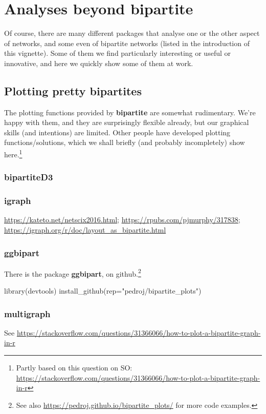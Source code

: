 \documentclass[a4paper, 11pt]{article}\usepackage[]{graphicx}\usepackage[]{color}
\newcommand{\package}[1]{\textbf{#1}}
\begin{document}
\section{Analyses beyond \package{bipartite}}%
Of course, there are many different packages that analyse one or the other aspect of networks, and some even of bipartite networks (listed in the introduction of this vignette). Some of them we find particularly interesting or useful or innovative, and here we quickly show some of them at work.

\subsection{Plotting pretty bipartites}
The plotting functions provided by \package{bipartite} are somewhat rudimentary. We're happy with them, and they are surprisingly flexible already, but our graphical skills (and intentions) are limited. Other people have developed plotting functions/solutions, which we shall briefly (and probably incompletely) show here.\footnote{Partly based on this question on SO: \url{https://stackoverflow.com/questions/31366066/how-to-plot-a-bipartite-graph-in-r}}

\subsubsection{\package{bipartiteD3}}

\subsubsection{\package{igraph}}
\url{https://kateto.net/netscix2016.html}; \url{https://rpubs.com/pjmurphy/317838}; \url{https://igraph.org/r/doc/layout_as_bipartite.html}

\subsubsection{\package{ggbipart}}
There is the package \package{ggbipart}, on github.\footnote{See also \url{https://pedroj.github.io/bipartite_plots/} for more code examples.}
\begin{Schunk}
\begin{Sinput}
library(devtools)
install_github(rep="pedroj/bipartite_plots")
\end{Sinput}
\end{Schunk}

\subsubsection{\package{multigraph}}
See \url{https://stackoverflow.com/questions/31366066/how-to-plot-a-bipartite-graph-in-r}
\end{document}
